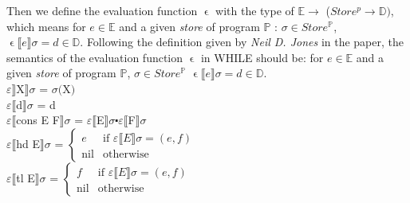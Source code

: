 \documentclass{jfrarticle}
\begin{document}
Then we define the evaluation function $\upvarepsilon$ with the type of $\mathds{E} \longrightarrow $ ($Store^p \rightarrow \mathds{D})$, 
which means for $e \in \mathds{E}$ and a given \textit{store} of program $\mathds{P}$ : $\sigma \in Store^{\mathds{P}}$, $\upvarepsilon \llbracket e \rrbracket \sigma = d \in \mathds{D}$.
Following the definition given by \textit{Neil D. Jones} in the paper\cite{jones_computability_1997}, the semantics of the evaluation function $\upvarepsilon$ in WHILE should be: for $e \in \mathds{E}$ and a given \textit{store} of program $\mathds{P}$, $\sigma \in Store^{\mathds{P}}$ $\upvarepsilon \llbracket e \rrbracket \sigma = d \in \mathds{D}$.\\
\indent\hspace{3cm}$\varepsilon \rrbracket$X$\rrbracket\sigma$ \hspace{1.5cm} = \hspace{0.3cm} $\sigma($X$)$\\
\indent\hspace{3cm}$\varepsilon \llbracket$d$\rrbracket\sigma$ \hspace{1.56cm} = \hspace{0.3cm} d\\
\indent\hspace{3cm}$\varepsilon \llbracket$cons E F$\rrbracket\sigma$ \hspace{0.4cm} = \hspace{0.3cm} $\varepsilon \llbracket$E$\rrbracket\sigma \centerdot \varepsilon \llbracket$F$\rrbracket\sigma$ \\
\indent\hspace{3cm}$\varepsilon \llbracket$hd E$\rrbracket\sigma$ \hspace{1.02cm} = \hspace{0.3cm} $\begin{cases} e & \mbox{if } \varepsilon \llbracket E \rrbracket\sigma = (e,f)\\ \mbox{nil} & \mbox{otherwise}\end{cases}$\\
\indent\hspace{3cm}$\varepsilon \llbracket$tl E$\rrbracket\sigma$ \hspace{1.2cm} = \hspace{0.3cm} $\begin{cases} f & \mbox{if } \varepsilon \llbracket E \rrbracket\sigma = (e,f)\\ \mbox{nil} & \mbox{otherwise}\end{cases}$\\
\end{document}
